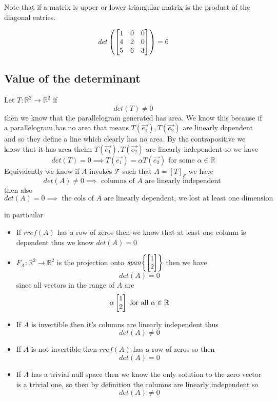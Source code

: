 \documentclass[11pt]{book}
\begin{document}
Note that if a matrix is upper or lower triangular matrix is the product of the diagonal entries.
\begin{eg}
    \[
    \mathit{det} \left(\mat[b]{ 1 & 0 & 0 \\ 4 & 2 & 0 \\ 5 & 6 & 3 }\right) = 6
    \]
\end{eg}


\subsection{Value of the determinant}%
\label{sub:value_of_the_determinant}

Let $T : \mathbb{R} ^2  \to \mathbb{R} ^2  $ if 
\[
\mathit{det} \left(T\right) \neq 0
\]
then we know that the parallelogram generated has area. We know this because if a parallelogram has no area that means $T\left(\vec{e_1} \right) , T\left(\vec{e_2} \right) $ are linearly dependent and so they define a line which clearly has no area. By the contrapositive we know that it has area thehn $T\left(\vec{e_1} \right) , T\left(\vec{e_2} \right) $ are linearly independent so we have
\[
\mathit{det} \left(T\right) = 0 \implies T\left(\vec{e_1} \right) = \alpha T\left(\vec{e_2} \right) \text{ for some  } \alpha \in \mathbb{R} 
\]
Equivalently we know if $A$ invokes $\mathcal{T} $ such that $A= \left[ T \right]_{\mathcal{E}} $ we have 
\[
\mathit{det} \left(A\right) \neq 0 \implies \text{ columns of $A$ are linearly independent  } 
\]
then also
\[
    \mathit{det} \left(A\right) = 0 \implies \text{ the cols of $A$ are linearly dependent, we lost at least one dimension  } 
\]

in particular 
\begin{itemize}
    \item If $\mathit{rref} \left(A\right) $ has a row of zeros then we know that at least one column is dependent thus we know $\boxed{\mathit{det} \left(A\right) = 0}$ 
    \item $F_{A}  : \mathbb{R} ^2  \to \mathbb{R} ^2  $ is the projection onto $\mathit{span} {\left\{ \mat{ 1 \\ 2 }  \right\} } $ then we have 
        \[
        \boxed{\mathit{det} \left(A\right) = 0 }
        \]
    since all vectors in the range of $A$ are
    \[
    \alpha \mat{ 1 \\ 2 } \text{ for all  } \alpha \in \mathbb{R} 
    \]
    \item If $A$ is invertible then it's columns are linearly independent thus 
        \[
            \boxed{\mathit{det} \left(A\right) \neq 0}
        \]
    \item If $A$ is not invertible then $\mathit{rref} \left(A\right) $ has a row of zeros so then 
        \[
        \boxed{\mathit{det} \left(A\right) = 0}
        \]
    \item If $A$ has a trivial null space then we know the only solution to the zero vector is a trivial one, so then by definition the columns are linearly independent so 
        \[
        \boxed{\mathit{det} \left(A\right) \neq 0}
        \]
\end{itemize}
\end{document}
